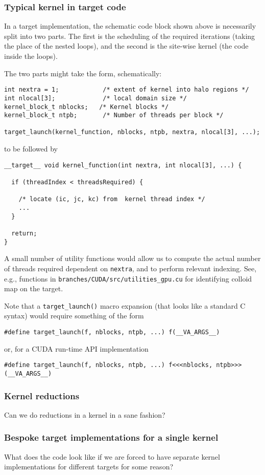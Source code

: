 \subsubsection{Typical kernel in target code}

In a target implementation, the schematic code block shown above is necessarily
split into two parts. The first is the scheduling of the required
iterations (taking the place of the nested loops), and the second
is the site-wise kernel (the code inside the loops).

The two parts might take the form, schematically:
\begin{lstlisting}
int nextra = 1;            /* extent of kernel into halo regions */
int nlocal[3];             /* local domain size */
kernel_block_t nblocks;   /* Kernel blocks */
kernel_block_t ntpb;       /* Number of threads per block */

target_launch(kernel_function, nblocks, ntpb, nextra, nlocal[3], ...);
\end{lstlisting}
to be followed by
\begin{lstlisting}
__target__ void kernel_function(int nextra, int nlocal[3], ...) {

  if (threadIndex < threadsRequired) {

    /* locate (ic, jc, kc) from  kernel thread index */
    ...
  }

  return;
}

\end{lstlisting}
A small number of utility functions would allow us to compute the actual
number of threads required dependent on \texttt{nextra}, and to perform
relevant indexing. See, e.g., functions in
\texttt{branches/CUDA/src/utilities\_gpu.cu}
for identifying colloid map on the target.

Note that a \texttt{target\_launch()} macro expansion (that looks
like a standard C syntax) would require something of the form
\begin{lstlisting}
#define target_launch(f, nblocks, ntpb, ...) f(__VA_ARGS__)
\end{lstlisting}
or, for a CUDA run-time API implementation
\begin{lstlisting}
#define target_launch(f, nblocks, ntpb, ...) f<<<nblocks, ntpb>>>(__VA_ARGS__)
\end{lstlisting}



\subsubsection{Kernel reductions}

Can we do reductions in a kernel in a sane fashion?

\subsubsection{Bespoke target implementations for a single kernel}

What does the code look like if we are forced to have separate kernel
implementations for different targets for some reason?

\vfill
\pagebreak

